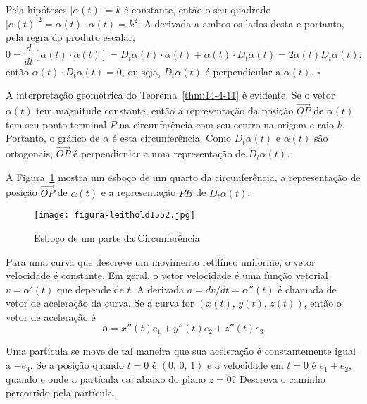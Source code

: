 \prova
Pela hipóteses $|\alpha(t)|=k$ é constante, então o seu quadrado $|\alpha(t)|^{2}= \alpha(t)\cdot \alpha(t)=k^{2}$. A derivada a ambos os lados desta
e  portanto, pela regra do produto escalar,
\begin{equation*}
0= \frac{d}{dt}\left[\alpha(t)\cdot\alpha(t) \right]=D_{t}\alpha(t)\cdot \alpha(t)+\alpha(t)\cdot D_{t}\alpha(t)=2\alpha(t)D_{t}\alpha(t);
\end{equation*}
então $\alpha(t)\cdot D_{t}\alpha(t)=0$, ou seja, $D_{t}\alpha(t)$ é perpendicular a $\alpha(t)$. \hfill $\square$

\bigskip
A interpretação geométrica do Teorema~\ref{thm:14-4-11} é evidente. Se o vetor \(\alpha(t)\) tem magnitude constante, então a representação da
posição \(\overrightarrow{OP}\) de \(\alpha(t)\) tem seu ponto terminal \(P\) na circunferência com seu centro na origem e raio \(k\). Portanto, o
gráfico de \(\alpha\) é esta circunferência. Como \(D_{t}\alpha(t)\) e \(\alpha(t)\) são ortogonais, \(\overrightarrow{OP}\) é perpendicular a uma
representação de \(D_{t}\alpha(t)\).

A Figura~\ref{fig:1552} mostra um esboço de um quarto da circunferência, a representação de posição \(\overrightarrow{OP}\) de \(\alpha(t)\) e a
representação \(PB\) de \(D_{t}\alpha(t)\).

\begin{figure}[!h]
  \centering
  \texttt{[image: figura-leithold1552.jpg]}
  \caption{Esboço de um parte da Circunferência}\label{fig:1552}
\end{figure}

Para uma curva que descreve um movimento retilíneo uniforme, o vetor velocidade é constante. Em geral, o vetor velocidade é uma função vetorial
$v =\alpha'(t)$ que depende de $t$. A derivada $a=dv/dt =\alpha''(t)$ é chamada de vetor de aceleração da curva. Se a curva for $(x(t),\, y(t),\,
z(t))$, então o vetor de aceleração é
\begin{equation*}
\boxed{\quad \mathbf{a}=x''(t)e_{1}+y''(t)e_{2}+z''(t)e_{3} \quad}
\end{equation*}

\begin{exc}
Uma partícula se move de tal maneira que sua aceleração é constantemente igual a $-e_{3}$. Se a posição quando $t=0$ é $(0,\, 0,\, 1)$ e a
velocidade em $t=0$ é $e_{1}+e_{2}$, quando e onde a partícula cai abaixo do plano $z=0$? Descreva o caminho percorrido pela partícula.
\end{exc}

